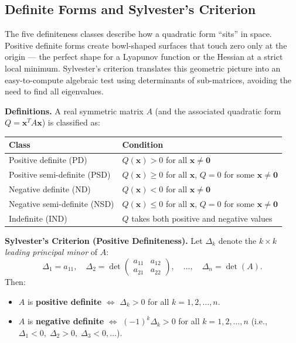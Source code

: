 \documentclass[12pt,a4paper]{article}
\begin{document}
\subsection{Definite Forms and Sylvester's Criterion}

The five definiteness classes describe how a quadratic form ``sits'' in space. Positive
definite forms create bowl-shaped surfaces that touch zero only at the origin --- the
perfect shape for a Lyapunov function or the Hessian at a strict local minimum. Sylvester's
criterion translates this geometric picture into an easy-to-compute algebraic test
using determinants of sub-matrices, avoiding the need to find all eigenvalues.

\begin{infobox}
\textbf{Definitions.} A real symmetric matrix \(A\) (and the associated quadratic form
\(Q = \mathbf{x}^{T} A \mathbf{x}\)) is classified as:

\medskip
\begin{tabular}{@{}ll@{}}
\toprule
\textbf{Class} & \textbf{Condition} \\
\midrule
Positive definite (PD)       & \(Q(\mathbf{x}) > 0\) for all \(\mathbf{x} \neq \mathbf{0}\) \\
Positive semi-definite (PSD) & \(Q(\mathbf{x}) \geq 0\) for all \(\mathbf{x}\),
                               \(Q = 0\) for some \(\mathbf{x} \neq \mathbf{0}\) \\
Negative definite (ND)       & \(Q(\mathbf{x}) < 0\) for all \(\mathbf{x} \neq \mathbf{0}\) \\
Negative semi-definite (NSD) & \(Q(\mathbf{x}) \leq 0\) for all \(\mathbf{x}\),
                               \(Q = 0\) for some \(\mathbf{x} \neq \mathbf{0}\) \\
Indefinite (IND)             & \(Q\) takes both positive and negative values \\
\bottomrule
\end{tabular}

\bigskip
\textbf{Sylvester's Criterion (Positive Definiteness).}
Let \(\Delta_k\) denote the \(k \times k\) \emph{leading principal minor} of \(A\):
\[
  \Delta_1 = a_{11}, \quad
  \Delta_2 = \det\begin{pmatrix} a_{11} & a_{12} \\ a_{21} & a_{22} \end{pmatrix},
  \quad \ldots, \quad \Delta_n = \det(A).
\]
Then:
\begin{itemize}[noitemsep]
  \item \(A\) is \textbf{positive definite} \(\iff\) \(\Delta_k > 0\) for all
        \(k = 1, 2, \ldots, n\).
  \item \(A\) is \textbf{negative definite} \(\iff\) \((-1)^k \Delta_k > 0\) for all
        \(k = 1, 2, \ldots, n\)
        (i.e., \(\Delta_1 < 0,\; \Delta_2 > 0,\; \Delta_3 < 0, \ldots\)).
\end{itemize}


\end{infobox}
\end{document}

